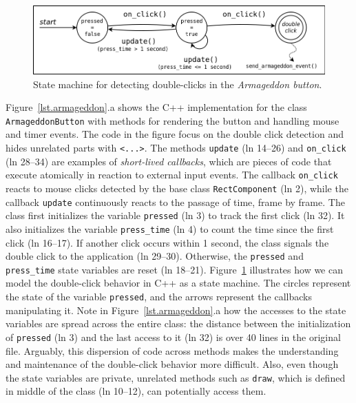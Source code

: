 \documentclass[10pt, conference, compsocconf]{IEEEtran}
\newcommand{\code}[1] {{\small{\texttt{#1}}}}
\begin{document}
\begin{figure}
\centering
\includegraphics[width=\columnwidth]{double-click}
\caption{State machine for detecting double-clicks in the
         \emph{Armageddon button}.
\label{fig.armageddon.fsm}
}
\end{figure}

Figure~\ref{lst.armageddon}.a shows the C++ implementation for the class
\code{ArmageddonButton} with methods for rendering the button and handling
mouse and timer events.
The code in the figure focus on the double click detection and hides unrelated
parts with \code{<...>}.
%
The methods \code{update} (ln 14--26) and \code{on\_click} (ln 28--34) are
examples of \emph{short-lived callbacks}, which are pieces of code that execute
atomically in reaction to external input events.
The callback \code{on\_click} reacts to mouse clicks detected by the base class
\code{RectComponent} (ln 2), while the callback \code{update} continuously
reacts to the passage of time, frame by frame.
%
The class first initializes the variable \code{pressed} (ln 3) to track the
first click (ln 32).
It also initializes the variable \code{press\_time} (ln 4) to count the time
since the first click (ln 16--17).
If another click occurs within 1 second, the class signals the double click to
the application (ln 29--30).
Otherwise, the \code{pressed} and \code{press\_time} state variables are reset
(ln 18--21).
%
Figure~\ref{fig.armageddon.fsm} illustrates how we can model the double-click 
behavior in C++ as a state machine.
The circles represent the state of the variable \code{pressed}, and the arrows 
represent the callbacks manipulating it.
%
Note in Figure~\ref{lst.armageddon}.a how the accesses to the state variables
are spread across the entire class: the distance between the initialization of
\code{pressed} (ln  3) and the last access to it (ln 32) is over 40 lines in
the original file.
Arguably, this dispersion of code across methods makes the understanding and 
maintenance of the double-click behavior more difficult.
Also, even though the state variables are private, unrelated methods such as 
\code{draw}, which is defined in middle of the class (ln 10--12), can
potentially access them.
\end{document}
